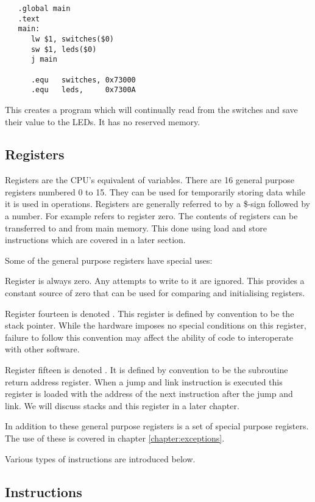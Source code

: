 \begin{verbatim}
   .global main
   .text
   main:
      lw $1, switches($0)
      sw $1, leds($0)
      j main

      .equ   switches, 0x73000
      .equ   leds,     0x7300A
\end{verbatim}

This creates a program which will continually read from the switches
and save their value to the LEDs. It has no reserved memory.

\subsection{Registers}
Registers are the CPU's equivalent of variables.  There are 16 general
purpose registers numbered 0 to 15. They can be used for temporarily
storing data while it is used in operations.  Registers are generally
referred to by a \$-sign followed by a number.  For example 
refers to register zero. The contents of registers can be transferred
to and from main memory. This done using load and store instructions
which are covered in a later section.


Some of the general purpose registers have special uses:

Register  is always zero.  Any attempts to write to it are
ignored.  This provides a constant source of zero that can be used for
comparing and initialising registers.

Register fourteen is denoted . This register is defined by
convention to be the stack pointer.  While the hardware imposes no
special conditions on this register, failure to follow this convention
may affect the ability of code to interoperate with other software.

Register fifteen is denoted . It is defined by convention to
be the subroutine return address register.  When a jump and link
instruction is executed this register is loaded with the address of
the next instruction after the jump and link. We will discuss stacks
and this register in a later chapter.

In addition to these general purpose registers is a set of special
purpose registers.  The use of these is covered in chapter
\ref{chapter:exceptions}.

Various types of instructions are introduced below.

\subsection{Instructions}

